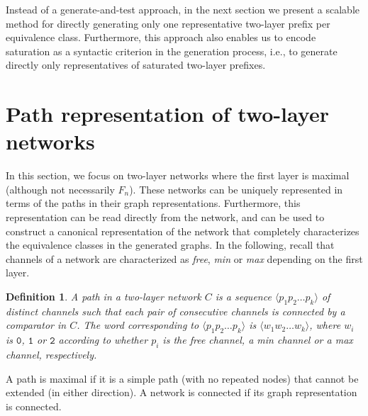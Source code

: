 \documentclass[10pt]{IEEEtran}
\newcommand{\sent}[1]{\ensuremath{\mathtt{#1}}} \newcommand{\GG}{{\cal G}}
\newcommand\tuple[1]{\langle #1 \rangle}
\newtheorem{definition}{Definition}
\begin{document}
Instead of a generate-and-test approach, in the next section we
present a scalable method for directly generating only one
representative two-layer prefix per equivalence class. Furthermore,
this approach also enables us to encode saturation as a syntactic
criterion in the generation process, i.e., to generate directly only
representatives of saturated two-layer prefixes.



\section{Path representation of two-layer networks}
\label{sec:pathrep}

In this section, we focus on two-layer networks where the first layer
is maximal (although not necessarily $F_n$).  These networks can be
uniquely represented in terms of the paths in their graph
representations. Furthermore, this representation can be read directly
from the network, and can be used to construct a canonical
representation of the network that completely characterizes the
equivalence classes in the generated graphs.  In the following, recall
that channels of a network are characterized as \emph{free},
\emph{min} or \emph{max} depending on the first layer.


\begin{definition}\label{def:path}
  A \emph{path} in a two-layer network $C$ is a sequence
  $\tuple{p_1p_2\ldots p_k}$ of distinct channels such that each pair
  of consecutive channels is connected by a comparator in $C$.
The \emph{word} corresponding to $\tuple{p_1p_2\ldots p_k}$ is
  $\tuple{w_1w_2\ldots w_k}$, where $w_i$ is \sent{0}, \sent{1} or \sent{2}
  according to whether $p_i$ is the free channel, a min channel or a
  max channel, respectively.
\end{definition}

A path is maximal if it is a simple path (with no repeated nodes) that
cannot be extended (in either direction).  A network is connected if
its graph representation is connected.
\end{document}
